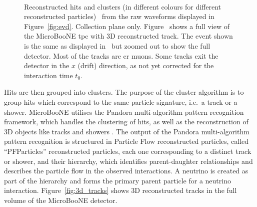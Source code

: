 \begin{figure}[]
\centering
{}  \quad
{} \\ 
\caption[Reconstructed Hits and Tracks]{Reconstructed hits and clusters (in different colours for different reconstructed particles)~\protect{} from the raw waveforms displayed in Figure~\ref{fig:evd}. Collection plane only. Figure~\protect{} shows a full view of the MicroBooNE \acrshort{tpc} with 3D reconstructed track. The event shown is the same as displayed in~\protect{} but zoomed out to show the full detector. Most of the tracks are \acrshort{cr} muons. Some tracks exit the detector in the $x$ (drift) direction, as not yet corrected for the interaction time $t_0$.}
\label{fig:reco_hits}
\end{figure}

Hits are then grouped into clusters.
The purpose of the cluster algorithm is to group hits which correspond to the same particle signature, i.e.~a track or a shower. 
MicroBooNE utilises the Pandora multi-algorithm pattern recognition framework, which handles the clustering of hits, as well as the reconstruction of 3D objects like tracks and showers \cite{pandora}.
The output of the Pandora multi-algorithm pattern recognition is structured in Particle Flow reconstructed particles, called ``PFParticles'' reconstructed particles, each one corresponding to a distinct track or shower, and their hierarchy, which identifies parent-daughter relationships and describes the particle flow in the observed interactions. 
A neutrino is created as part of the hierarchy and forms the primary parent particle for a neutrino interaction. 
Figure~\ref{fig:3d_tracks} shows 3D reconstructed tracks in the full volume of the MicroBooNE detector.

